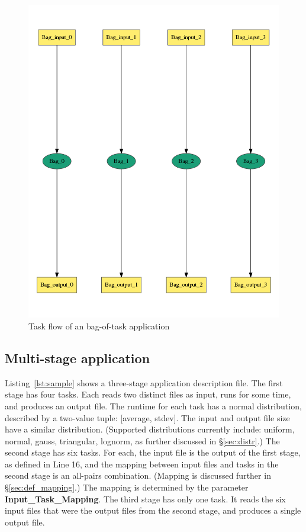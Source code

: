 \documentclass[10pt,a4paper]{article}
\begin{document}
\begin{figure}
   \includegraphics[width=120mm]{picture/bag}
\caption {Task flow of an bag-of-task application 
   \label{fig:bag}
}
\end{figure}


\subsection{Multi-stage application}

Listing~\ref{lst:sample} shows a three-stage application description file. The first stage has four tasks. Each reads two distinct files as input, runs for some time, and produces an output
file. The runtime for each task has a normal distribution, described by a two-value tuple: [average, stdev]. The input and output file size have a similar distribution. (Supported distributions
currently include: uniform, normal, gauss, triangular, lognorm, as further discussed in \S\ref{sec:distr}.) The second stage has six tasks. For each, the input file is the output of the first stage, as defined in Line 16, and the mapping between input 
files and tasks in the second stage is an all-pairs combination. (Mapping is discussed further in \S\ref{sec:def_mapping}.) The mapping is determined by the parameter \textbf{Input\_Task\_Mapping}. 
The third stage has only one task. 
It reads the six input files that were the output files from the second stage, and produces a single output file.
\end{document}
